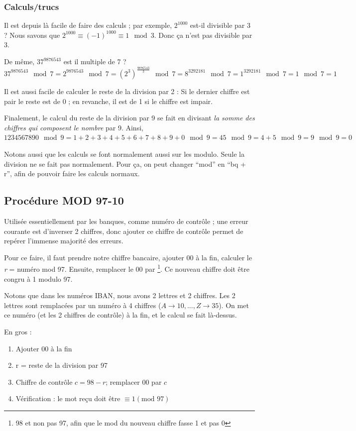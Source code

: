 \documentclass[11pt,a4paper]{article}
\renewcommand{\)}{\right)}
\renewcommand{\(}{\left(}
\begin{document}
\subsubsection{Calculs/trucs}
Il est depuis là facile de faire des calculs ; par exemple, $2^{1000}$ est-il divisible par 3 ? Nous savons que $2^{1000} \equiv (-1)^{1000} \equiv 1 \mod 3$. Donc ça n'est pas divisible par 3.

De même, $37^{9876543}$ est il multiple de 7 ? $37^{9876543} \mod 7 = 2^{9876543} \mod 7 = 	(2^3)^{\frac{9876543}{3}} \mod 7 = 8^{3292181} \mod 7 = 1^{3292181} \mod 7 = 1 \mod 7 = 1$

Il est aussi facile de calculer le reste de la division par 2 : Si le dernier chiffre est pair le reste est de 0 ; en revanche, il  est de 1 si le chiffre est impair.

Finalement, le calcul du reste de la division par 9 se fait en divisant \textit{la somme des chiffres qui composent le nombre} par 9. Ainsi, $1234567890 \mod 9 = 1+2+3+4+5+6+7+8+9+0 \mod 9 = 45 \mod 9 = 4+5 \mod 9 = 9 \mod 9 = 0$

Notons aussi que les calculs se font normalement aussi sur les modulo. Seule la division ne se fait pas normalement. Pour ça, on peut changer \enquote{mod} en \enquote{bq + r}, afin de pouvoir faire les calculs normaux.
\subsection{Procédure MOD 97-10}
Utilisée essentiellement par les banques, comme numéro de contrôle ; une erreur courante est d'inverser 2 chiffres, donc ajouter ce chiffre de contrôle permet de repérer l'immense majorité des erreurs.

Pour ce faire, il faut prendre notre chiffre bancaire, ajouter 00 à la fin, calculer le \textit{r} = numéro mod 97. Ensuite, remplacer le 00 par \footnote{98 et non pas 97, afin que le mod du nouveau chiffre fasse 1 et pas 0}. Ce nouveau chiffre doit être congru à 1 modulo 97.

Notons que dans les numéros IBAN, nous avons 2 lettres et 2 chiffres. Les 2 lettres sont remplacées par un numéro à 4 chiffres ($A\to 10,...,Z\to 35$). On met ce numéro (et les 2 chiffres de contrôle) à la fin, et le calcul se fait là-dessus.

En gros :
\begin{enumerate}
	\item 	Ajouter 00 à la fin
	\item 	r = reste de la division par 97
	\item 	Chiffre de contrôle $c = 98-r$; remplacer 00 par $c$
	\item 	Vérification : le mot reçu doit être $\equiv 1 (\text{mod }97)$
\end{enumerate}
\end{document}
